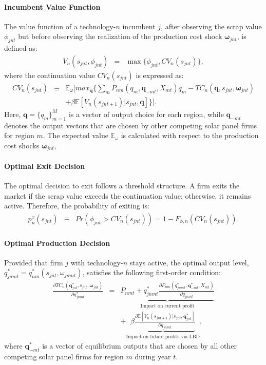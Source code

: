 \documentclass[12pt, letter]{article}
\begin{document}
\paragraph{Incumbent Value Function}
The value function of a technology-$n$ incumbent $j$, after observing the scrap value $\phi_{jnt}$ but before observing the realization of the production cost shock $\mathbf{\omega}_{jnt}$, is defined as:
\begin{eqnarray}
V_n(s_{jnt},\phi_{jnt})&=&\max\{\phi_{jnt},CV_n(s_{jnt})\},  \label{eq:incumbent_value_fn} 
\end{eqnarray}
where the continuation value $CV_n(s_{jnt})$  is expressed as:
\begin{eqnarray}
CV_n(s_{jnt}) & \equiv & \mathbb{E}_{\omega}\Big[ max_{\mathbf{q}} \{\sum_m P_{nm}(q_{m}, \mathbf{q}_{-mt},X_{mt}) q_{m} - TC_{n}(\mathbf{q},s_{jnt},\mathbf{\omega}_{jnt})  \nonumber \\
&& +\beta \mathbb{E}[V_n(s_{jnt+1})|s_{jnt}, \mathbf{q}] \}\Big]. \label{eq:incumbent_EV_fn}
\end{eqnarray}
Here, $\mathbf{q} = \{q_m\}_{m=1}^M$ is a vector of output choice for each region, while $\mathbf{q}_{-mt}$ denotes the output vectors that are chosen by other competing solar panel firms for region $m$. The expected value $\mathbb{E}_{\omega}$ is calculated with respect to the production cost shocks $\mathbf{\omega}_{jnt}$, 

\paragraph{Optimal Exit Decision}
The optimal decision to exit follows a threshold structure. A firm exits the market if the scrap value exceeds the continuation value; otherwise, it remains active. Therefore, the probability of exiting is:
\begin{eqnarray}
    p_n^x(s_{jnt}) & \equiv & Pr\!\left(\phi_{jnt} > CV_n(s_{jnt})\right) = 1-F_{\phi,n}\!\left(CV_n(s_{jnt})\right). \label{eq:exit_policy_fn}
\end{eqnarray}

\paragraph{Optimal Production Decision}
Provided that firm $j$ with technology-$n$ stays active, the optimal output level, $q_{jnmt}^*=q_{nm}^*(s_{jnt},\omega_{jnmt})$, satisfies the following first-order condition:
 \begin{eqnarray}
 \frac{\partial TC_{n}(\mathbf{q}_{jnt}^*,s_{jnt},\mathbf{\omega}_{jnt})}{\partial q_{jnmt}^*} & = & \underbrace{
    P_{nmt}+q_{jnmt}^*\frac{\partial P_{nm}(q^*_{jnmt}, \mathbf{q}^*_{-mt},X_{mt})}{\partial q_{jnmt}}}_{\text{Impact on current profit}} \nonumber \\
    && +  \underbrace{\beta \frac{\partial \mathbb{E}[V_n(s_{jnt+1})|s_{jnt}, \mathbf{q}_{jnt}^*] }{\partial q_{jnmt}} }_{\text{Impact on future profits via LBD}}, \label{eq:model_foc_q}
\end{eqnarray}  
where $\mathbf{q}^*_{-mt}$ is a vector of equilibrium outputs that are chosen by all other competing solar panel firms for region $m$ during year $t$.
\end{document}
